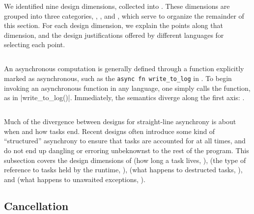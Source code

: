 We identified nine design dimensions, collected into . These dimensions are grouped into three categories, \StartOfLife, \EndOfLife, and \Cancellation, which serve to organize the remainder of this section. For each design dimension, we explain the points along that dimension, and the design justifications offered by different languages for selecting each point.

\subsection{\StartOfLife}

An asynchronous computation is generally defined through a function explicitly marked as asynchronous, such as the \lstinline[language=Pseudo]|async fn write_to_log| in . To begin invoking an asynchronous function in any language, one simply calls the function, as in \code|write_to_log()|. Immediately, the semantics diverge along the first axis: \Eagerness.





\subsection{\EndOfLife}

Much of the divergence between designs for straight-line asynchrony is about when and how tasks end. Recent designs often introduce some kind of ``structured'' asynchrony to ensure that tasks are accounted for at all times, and do not end up dangling or erroring unbeknownst to the rest of the program. This subsection covers the design dimensions of \extent (how long a task lives, ),  (the type of reference to tasks held by the runtime, ), \destruction (what happens to destructed tasks, ), and \propagation (what happens to unawaited exceptions, ).









\subsection{Cancellation}\label{ssec:designdims:cancellation}

